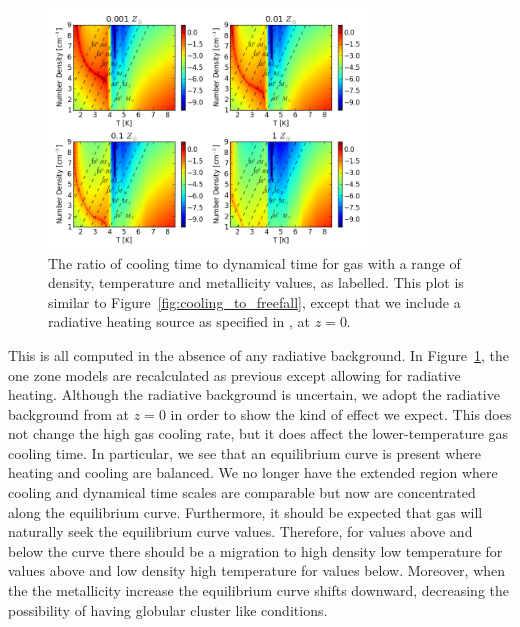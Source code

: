 \documentclass[useAMS,usenatbib]{mn2e}
\begin{document}
\begin{figure}
\begin{center}
\mbox{\includegraphics[width=8.5cm]{Images/cooling_to_freefall}}
\end{center}
\caption{\label{fig:cooling_to_freefall_background} The ratio of cooling time to dynamical time for gas with a range of density, temperature and metallicity values, as labelled.  This plot is similar to Figure~\ref{fig:cooling_to_freefall}, except that we include a radiative heating source as specified in \citet{Haardt2012}, at $z=$0.}
\end{figure}

This is all computed in the absence of any radiative background.  In Figure~\ref{fig:cooling_to_freefall_background}, 
the one zone models are recalculated as previous except allowing for radiative heating.   Although the radiative background
is uncertain, we adopt the radiative background from \citet{Haardt2012} at $z=$0 
in order to show the kind of effect we expect.  This does not change the high gas cooling rate, but it does affect the lower-temperature gas cooling time.   In particular, we see that an equilibrium curve is present where
heating and cooling are balanced. We no longer have the extended region where cooling and dynamical time scales are 
comparable but now are concentrated along the equilibrium curve. Furthermore, it should be expected that gas will
naturally seek the equilibrium curve values. Therefore, for values above and below the curve there should be a migration
to high density low temperature for values above and low density high temperature for values below.  Moreover, when the
the metallicity increase the equilibrium curve shifts downward, decreasing the possibility of having globular cluster
like conditions.
\end{document}
